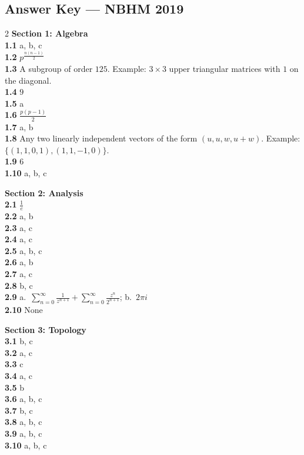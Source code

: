 \documentclass[11pt,a4paper]{article}
\newcommand{\examsec}[1]{%
  \subsection*{#1}
  \vspace{-2pt}
}
\begin{document}
\examsec{Answer Key --- NBHM 2019}
\begin{multicols}{2}
\textbf{Section 1: Algebra}\\
\textbf{1.1} a, b, c\\
\textbf{1.2} $p^{\frac{n(n-1)}{2}}$\\
\textbf{1.3} A subgroup of order $125$. Example: $3 \times 3$ upper triangular matrices with $1$ on the diagonal.\\
\textbf{1.4} $9$\\
\textbf{1.5} a\\
\textbf{1.6} $\frac{p(p-1)}{2}$\\
\textbf{1.7} a, b\\
\textbf{1.8} Any two linearly independent vectors of the form $(u, u, w, u + w)$. Example: $\{(1, 1, 0, 1), (1, 1, -1, 0)\}$.\\
\textbf{1.9} $6$\\
\textbf{1.10} a, b, c

\medskip
\textbf{Section 2: Analysis}\\
\textbf{2.1} $\frac{1}{e}$\\
\textbf{2.2} a, b\\
\textbf{2.3} a, c\\
\textbf{2.4} a, c\\
\textbf{2.5} a, b, c\\
\textbf{2.6} a, b\\
\textbf{2.7} a, c\\
\textbf{2.8} b, c\\
\textbf{2.9} a.\ $\sum_{n=0}^{\infty} \frac{1}{z^{n+1}} + \sum_{n=0}^{\infty} \frac{z^n}{2^{n+1}}$; b.\ $2\pi i$\\
\textbf{2.10} None

\medskip
\textbf{Section 3: Topology}\\
\textbf{3.1} b, c\\
\textbf{3.2} a, c\\
\textbf{3.3} c\\
\textbf{3.4} a, c\\
\textbf{3.5} b\\
\textbf{3.6} a, b, c\\
\textbf{3.7} b, c\\
\textbf{3.8} a, b, c\\
\textbf{3.9} a, b, c\\
\textbf{3.10} a, b, c


\end{multicols}
\end{document}
